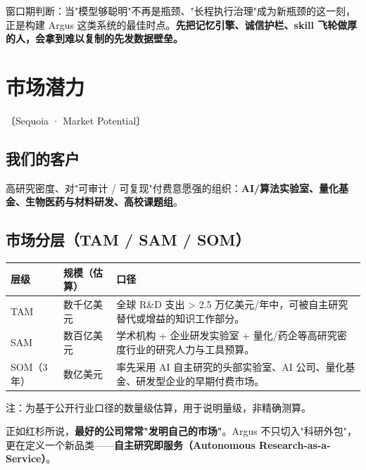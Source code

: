 \documentclass[UTF8,11pt,fontset=none]{ctexart}
\newcommand{\hl}[1]{\textbf{\color{argusnavy}#1}}
\newcommand{\thd}[1]{\textbf{\color{white}#1}}
\newcommand{\headrow}{\rowcolor{argusnavy}}
\newcommand{\altrow}{\rowcolor{arguslight}}
\newcommand{\sq}[1]{\hfill{\sffamily\footnotesize\color{argusgray}〔Sequoia · #1〕}}
\begin{document}
\begin{keybox}
窗口期判断：当"模型够聪明"不再是瓶颈、"长程执行治理"成为新瓶颈的这一刻，正是构建 Argus 这类系统的最佳时点。\textbf{先把记忆引擎、诚信护栏、skill 飞轮做厚的人，会拿到难以复制的先发数据壁垒。}
\end{keybox}

\section{市场潜力}\sq{Market Potential}

\subsection{我们的客户}
高研究密度、对"可审计 / 可复现"付费意愿强的组织：\hl{AI/算法实验室、量化基金、生物医药与材料研发、高校课题组}。

\subsection{市场分层（TAM / SAM / SOM）}

\begin{tabularx}{\textwidth}{@{}l >{\raggedright\arraybackslash}p{3.0cm} X@{}}
\toprule
\headrow \thd{层级} & \thd{规模（估算）} & \thd{口径} \\
\midrule
\altrow TAM & 数千亿美元 & 全球 R\&D 支出 > 2.5 万亿美元/年中，可被自主研究替代或增益的知识工作部分。 \\
SAM & 数百亿美元 & 学术机构 + 企业研发实验室 + 量化/药企等高研究密度行业的研究人力与工具预算。 \\
\altrow SOM（3年） & 数亿美元 & 率先采用 AI 自主研究的头部实验室、AI 公司、量化基金、研发型企业的早期付费市场。 \\
\bottomrule
\end{tabularx}

{\footnotesize\color{argusgray}注：为基于公开行业口径的数量级估算，用于说明量级，非精确测算。}\par

\begin{quotebox}
正如红杉所说，\textbf{最好的公司常常"发明自己的市场"}。Argus 不只切入"科研外包"，更在定义一个新品类——\textbf{自主研究即服务（Autonomous Research-as-a-Service）}。
\end{quotebox}

\end{document}
